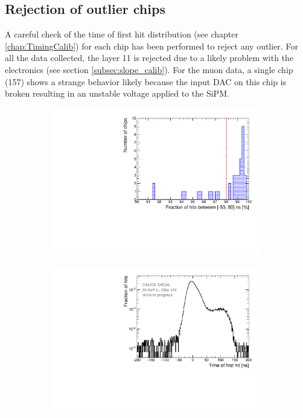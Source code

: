 \subsection{Rejection of outlier chips}
\label{sec:ChipRejection}

A careful check of the time of first hit distribution (see chapter \ref{chap:TimingCalib}) for each chip has been performed to reject any outlier. For all the data collected, the layer 11 is rejected due to a likely problem with the electronics (see section \ref{subsec:slope_calib}). For the muon data, a single chip (157) shows a strange behavior likely because the input DAC on this chip is broken resulting in an unstable voltage applied to the SiPM.

\begin{figure}[htbp!]
	\begin{subfigure}[t]{0.49\textwidth}
		\centering
		\includegraphics[width=1\linewidth]{../Thesis_Plots/Timing/Electrons/Plots/FractionRejectedChips.pdf}
		\caption{} \label{fig:FracRejChip}
	\end{subfigure}
	\hfill
	\begin{subfigure}[t]{0.49\textwidth}
		\centering
		\includegraphics[width=1\linewidth]{../Thesis_Plots/Timing/Electrons/Plots/ExampleBadChip149.pdf}

\end{subfigure}
\end{figure}
